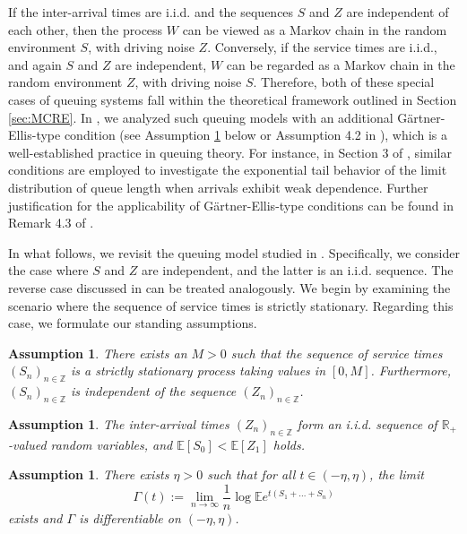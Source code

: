 \documentclass[a4paper,10pt]{article}
\newtheorem{assumption}[theorem]{Assumption}
\newcommand{\Z}{\mathbb{Z}}
\newcommand{\R}{\mathbb{R}}
\newcommand{\E}{\mathbb{E}}
\begin{document}
\smallskip
If the inter-arrival times are i.i.d. and the sequences $S$ and $Z$ are independent of each other, then the process $W$ can be viewed as a Markov chain in the random environment $S$, with driving noise $Z$. Conversely, if the service times are i.i.d., and again $S$ and $Z$ are independent, $W$ can be regarded as a Markov chain in the random environment $Z$, with driving noise $S$. Therefore, both of these special cases of queuing systems fall within the theoretical framework outlined in Section \ref{sec:MCRE}.
In \cite{lovas2021ergodic,lovas}, we analyzed such queuing models with an additional G\"artner-Ellis-type condition (see Assumption \ref{as:queue:GE} below or Assumption 4.2 in \cite{lovas}), which is a well-established practice in queuing theory. For instance, in Section 3 of \cite{gyorfi2002}, similar conditions are employed to investigate the exponential tail behavior of the limit distribution of queue length when arrivals exhibit weak dependence. Further justification for the applicability of G\"artner-Ellis-type conditions can be found in Remark 4.3 of \cite{lovas}.

\smallskip
In what follows, we revisit the queuing model studied in \cite{lovas}. Specifically, we consider the case where $S$ and $Z$ are independent, and the latter is an i.i.d. sequence. The reverse case discussed in \cite{lovas2021ergodic} can be treated analogously. We begin by examining the scenario where the sequence of service times is strictly stationary. Regarding this case, we formulate our standing assumptions.
\begin{assumption}\label{as:queue:proc}
	There exists an $M > 0$ such that the sequence of service times $(S_n)_{n\in\Z}$ is a strictly stationary process taking values in $[0,M]$. Furthermore, $(S_n)_{n\in\Z}$ is independent of the sequence $(Z_n)_{n\in\Z}$.
\end{assumption}

\begin{assumption}\label{as:queue:stab}
	The inter-arrival times $(Z_n)_{n\in\Z}$ form an i.i.d. sequence of $\R_{+}$-valued random variables, and $\E[S_0] < \E[Z_1]$ holds.
\end{assumption}

\begin{assumption}\label{as:queue:GE}
There exists $\eta > 0$ such that for all $t \in (-\eta, \eta)$, the limit
		\begin{equation*}
			\Gamma(t) := \lim_{n\to\infty} \frac{1}{n} \log \E e^{t(S_1 + \ldots + S_n)}
		\end{equation*}
		exists and $\Gamma$ is differentiable on $(-\eta, \eta)$.
\end{assumption}
\end{document}

